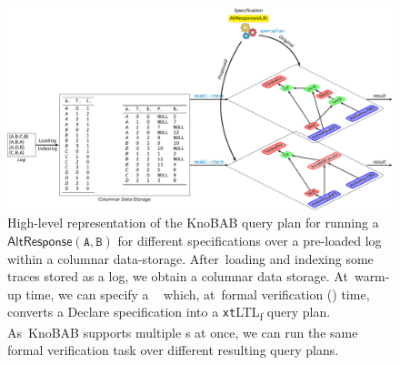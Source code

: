 \documentclass[information,article,accept,pdftex,oneauthor]{Definitions/mdpi}
\newcommand{\DeclareClauseNoData}[3]{\textsf{#1}(\texttt{#2},\texttt{#3})}
\begin{document}
\begin{figure}[H]
\includegraphics[width=.85\linewidth]{images/workflow_b.pdf}
\caption{{High-level} %
 representation of the KnoBAB query plan for running a $\DeclareClauseNoData{AltResponse}{A}{B}$ for different specifications over a pre-loaded log within a columnar data-storage. After~loading and indexing some traces stored as a log, we obtain a columnar data storage. At~warm-up time, we can specify a \texttt{\color{oceanboatblue}{queryplan}%
} which, at~formal verification (\texttt{\color{oceanboatblue}{model-check}}) time, converts a Declare specification into a \texttt{xt}LTL\textsubscript{f} query plan. As~KnoBAB supports multiple \texttt{\color{oceanboatblue}{queryplan}}s at once, we can run the same formal verification task over different resulting query plans.}\label{fig1}
\end{figure}
\end{document}
